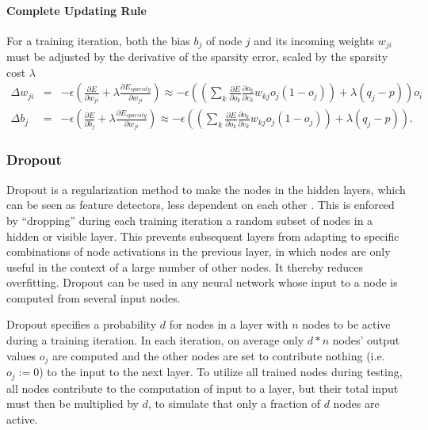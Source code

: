 \paragraph{Complete Updating Rule}

For a training iteration, both the bias $b_{j}$ of node $j$ and
its incoming weights $w_{ji}$ must be adjusted by the derivative
of the sparsity error, scaled by the sparsity cost
$\lambda$
\begin{eqnarray*}
\Delta w_{ji} & = & -\epsilon\left(\frac{\partial E}{\partial w_{ji}}+\lambda\frac{\partial E_{sparsity}}{\partial w_{ji}}\right)\approx-\epsilon\left(\left(\sum_{k}\frac{\partial E}{\partial o_{k}}\frac{\partial o_{k}}{\partial v_{k}}w_{kj}o_{j}(1-o_{j})\right)+\lambda(q_{j}-p)\right)o_{i}\\
\Delta b_{j} & = & -\epsilon\left(\frac{\partial E}{\partial b_{j}}+\lambda\frac{\partial E_{sparsity}}{\partial w_{ji}}\right)\approx-\epsilon\left(\left(\sum_{k}\frac{\partial E}{\partial o_{k}}\frac{\partial o_{k}}{\partial v_{k}}w_{kj}o_{j}(1-o_{j})\right)+\lambda(q_{j}-p)\right).
\end{eqnarray*}

\subsubsection{Dropout\label{subsec:Dropout}}

Dropout is a regularization method to make the nodes
in the hidden layers, which can be seen as feature detectors, less
dependent on each other \cite{SrivastavaSalakhutdinov2014}. This
is enforced by ``dropping'' during each training iteration a random
subset of nodes in a hidden or visible layer. This prevents subsequent
layers from adapting to specific combinations of node activations
in the previous layer, in which nodes are only useful in the context
of a large number of other nodes. It thereby reduces overfitting.
Dropout can be used in any neural network whose input to a node is
computed from several input nodes. 

Dropout specifies a probability $d$ for nodes in a layer with $n$
nodes to be active during a training iteration. In each iteration,
on average only $d*n$ nodes' output values $o_{j}$ are computed
and the other nodes are set to contribute nothing (i.e. $o_{j}:=0$)
to the input to the next layer. To utilize all trained nodes during
testing, all nodes contribute to the computation of input to a layer,
but their total input must then be multiplied by $d$, to simulate
that only a fraction of $d$ nodes are active.

